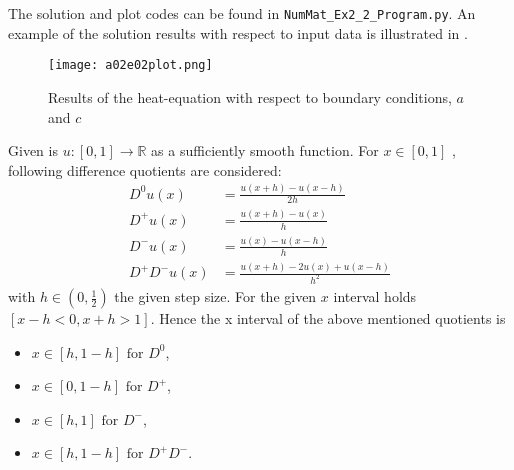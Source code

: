 %
The solution and plot codes can be found in \texttt{NumMat\_Ex2\_2\_Program.py}.
An example of the solution results with respect to input data is illustrated in .
%
\begin{figure}[H]
\vspace*{\FigUpperVSpace}
	\texttt{[image: a02e02plot.png]} 
	\caption{Results of the heat-equation with respect to boundary conditions, $a$ and $c$}
	\label{fig:a02e02plot}
\end{figure}

Given is $u \colon [0,1] \rightarrow \mathbb{R}$ as a sufficiently smooth function.
For $x \in [0,1]$ , following difference quotients are considered:
\begin{align}
	\label{eq:D0}
	D^0u(x) &= \frac{u(x+h) - u(x-h)}{2h}\\
	\label{eq:D+}
	D^+u(x) &= \frac{u(x+h) - u(x)}{h}   \\
	\label{eq:D-}
	D^-u(x) &= \frac{u(x)   - u(x-h)}{h} \\
	\label{eq:D+-}
	D^+D^-u(x) &= \frac{u(x+h) -2u(x)  + u(x-h)}{h^2}
\end{align}
with $ h \in \left(0, \frac{1}{2}\right)$ the given step size.
For the given $x$ interval holds $[x-h < 0, x+h > 1]$.
Hence the x interval of the above mentioned quotients is
\begin{itemize}
	\item $x \in [h, 1-h] \text{ for } D^0$,
	\item $x \in [0, 1-h] \text{ for } D^+$,
	\item $x \in [h,   1] \text{ for } D^-$,
	\item $x \in [h, 1-h] \text{ for } D^+D^-$.\\
\end{itemize}

